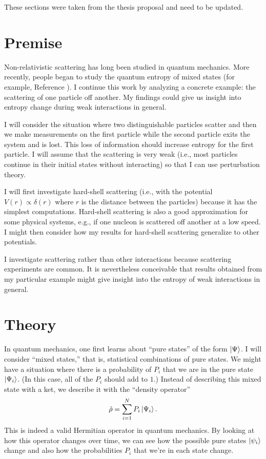 
These sections were taken from the thesis proposal and need to be updated.

\section{Premise}

Non-relativistic scattering has long been studied in quantum mechanics. More recently, people began to study the quantum entropy of mixed states (for example, Reference \cite{Cheung2023}). I continue this work by analyzing a concrete example: the scattering of one particle off another. My findings could give us insight into entropy change during weak interactions in general.

I will consider the situation where two distinguishable particles scatter and then we make measurements on the first particle while the second particle exits the system and is lost. This loss of information should increase entropy for the first particle. I will assume that the scattering is very weak (i.e., most particles continue in their initial states without interacting) so that I can use perturbation theory.

I will first investigate hard-shell scattering (i.e., with the potential \(V(r) \propto \delta(r)\) where \(r\) is the distance between the particles) because it has the simplest computations. Hard-shell scattering is also a good approximation for some physical systems, e.g., if one nucleon is scattered off another at a low speed. I might then consider how my results for hard-shell scattering generalize to other potentials.

I investigate scattering rather than other interactions because scattering experiments are common. It is nevertheless conceivable that results obtained from my particular example might give insight into the entropy of weak interactions in general.

\section{Theory}

In quantum mechanics, one first learns about ``pure states'' of the form \(\left|\Psi\right\rangle\). I will consider ``mixed states,'' that is, statistical combinations of pure states. We might have a situation where there is a probability of \(P_i\) that we are in the pure state \(\left|\Psi_i\right\rangle\). (In this case, all of the \(P_i\) should add to \(1\).) Instead of describing this mixed state with a ket, we describe it with the ``density operator'' \[\hat{\rho} = \sum_{i=1}^N P_i \left|\Psi_i\right\rangle.\] This is indeed a valid Hermitian operator in quantum mechanics. By looking at how this operator changes over time, we can see how the possible pure states \(\left|\psi_i\right\rangle\) change and also how the probabilities \(P_i\) that we’re in each state change.

